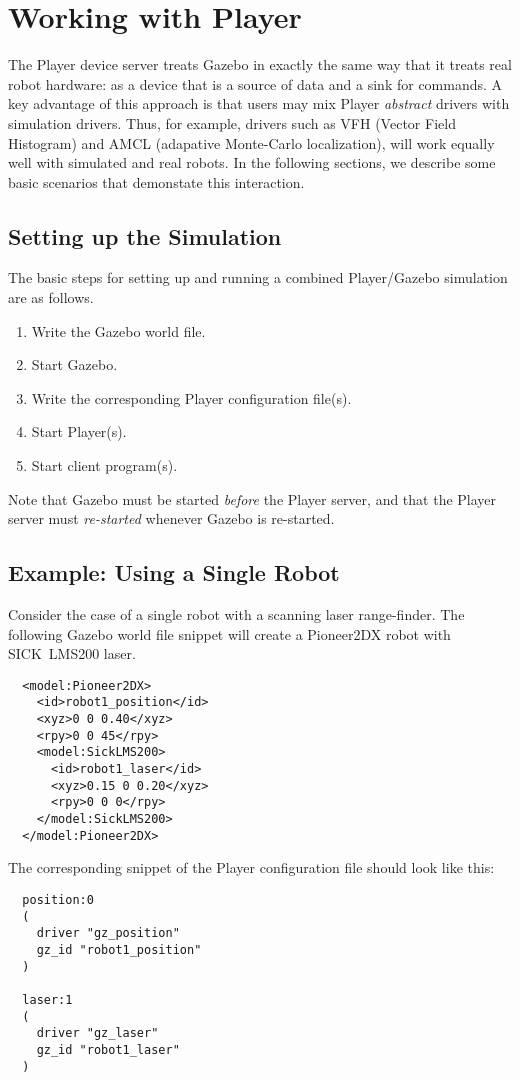 


\chapter{Working with Player}
\label{sec.player}

The Player device server treats Gazebo in exactly the same way that it
treats real robot hardware: as a device that is a source of data and a
sink for commands.  A key advantage of this approach is that users may
mix Player {\em abstract} drivers with simulation drivers.  Thus, for
example, drivers such as VFH (Vector Field Histogram) and AMCL
(adapative Monte-Carlo localization), will work equally well with
simulated and real robots.  In the following sections, we describe
some basic scenarios that demonstate this interaction.

\section{Setting up the Simulation}

The basic steps for setting up and running a combined Player/Gazebo
simulation are as follows.
\begin{enumerate}
\item Write the Gazebo world file.
\item Start Gazebo.
\item Write the corresponding Player configuration file(s).
\item Start Player(s).
\item Start client program(s).
\end{enumerate}
Note that Gazebo must be started {\em before} the Player server, and
that the Player server must {\em re-started} whenever Gazebo is
re-started.


\section{Example: Using a Single Robot}

Consider the case of a single robot with a scanning laser
range-finder.  The following Gazebo world file snippet will create a
Pioneer2DX robot with SICK~LMS200 laser.
\begin{verbatim}
  <model:Pioneer2DX>
    <id>robot1_position</id>
    <xyz>0 0 0.40</xyz>
    <rpy>0 0 45</rpy>
    <model:SickLMS200>
      <id>robot1_laser</id>
      <xyz>0.15 0 0.20</xyz>
      <rpy>0 0 0</rpy>
    </model:SickLMS200>
  </model:Pioneer2DX>
\end{verbatim}
The corresponding snippet of the Player configuration file should look
like this:
\begin{verbatim}
  position:0
  (
    driver "gz_position"
    gz_id "robot1_position"
  )

  laser:1
  (
    driver "gz_laser"
    gz_id "robot1_laser"
  )
\end{verbatim}


